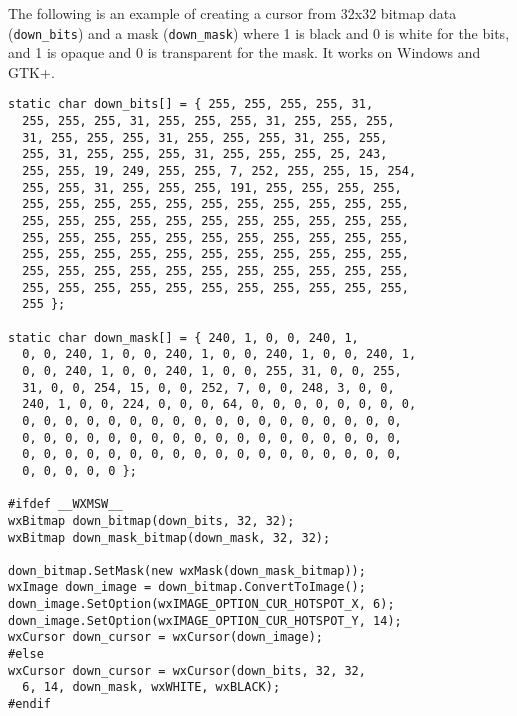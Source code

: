 

The following is an example of creating a
cursor from 32x32 bitmap data ({\tt down\_bits}) and a mask
({\tt down\_mask}) where 1 is black and 0 is white for
the bits, and 1 is opaque and 0 is transparent for
the mask. It works on Windows and GTK+.

\begin{verbatim}
static char down_bits[] = { 255, 255, 255, 255, 31,
  255, 255, 255, 31, 255, 255, 255, 31, 255, 255, 255,
  31, 255, 255, 255, 31, 255, 255, 255, 31, 255, 255,
  255, 31, 255, 255, 255, 31, 255, 255, 255, 25, 243,
  255, 255, 19, 249, 255, 255, 7, 252, 255, 255, 15, 254,
  255, 255, 31, 255, 255, 255, 191, 255, 255, 255, 255,
  255, 255, 255, 255, 255, 255, 255, 255, 255, 255, 255,
  255, 255, 255, 255, 255, 255, 255, 255, 255, 255, 255,
  255, 255, 255, 255, 255, 255, 255, 255, 255, 255, 255,
  255, 255, 255, 255, 255, 255, 255, 255, 255, 255, 255,
  255, 255, 255, 255, 255, 255, 255, 255, 255, 255, 255,
  255, 255, 255, 255, 255, 255, 255, 255, 255, 255, 255,
  255 };

static char down_mask[] = { 240, 1, 0, 0, 240, 1,
  0, 0, 240, 1, 0, 0, 240, 1, 0, 0, 240, 1, 0, 0, 240, 1,
  0, 0, 240, 1, 0, 0, 240, 1, 0, 0, 255, 31, 0, 0, 255,
  31, 0, 0, 254, 15, 0, 0, 252, 7, 0, 0, 248, 3, 0, 0,
  240, 1, 0, 0, 224, 0, 0, 0, 64, 0, 0, 0, 0, 0, 0, 0, 0,
  0, 0, 0, 0, 0, 0, 0, 0, 0, 0, 0, 0, 0, 0, 0, 0, 0, 0,
  0, 0, 0, 0, 0, 0, 0, 0, 0, 0, 0, 0, 0, 0, 0, 0, 0, 0,
  0, 0, 0, 0, 0, 0, 0, 0, 0, 0, 0, 0, 0, 0, 0, 0, 0, 0,
  0, 0, 0, 0, 0 };

#ifdef __WXMSW__
wxBitmap down_bitmap(down_bits, 32, 32);
wxBitmap down_mask_bitmap(down_mask, 32, 32);

down_bitmap.SetMask(new wxMask(down_mask_bitmap));
wxImage down_image = down_bitmap.ConvertToImage();
down_image.SetOption(wxIMAGE_OPTION_CUR_HOTSPOT_X, 6);
down_image.SetOption(wxIMAGE_OPTION_CUR_HOTSPOT_Y, 14);
wxCursor down_cursor = wxCursor(down_image);
#else
wxCursor down_cursor = wxCursor(down_bits, 32, 32,
  6, 14, down_mask, wxWHITE, wxBLACK);
#endif
\end{verbatim}

